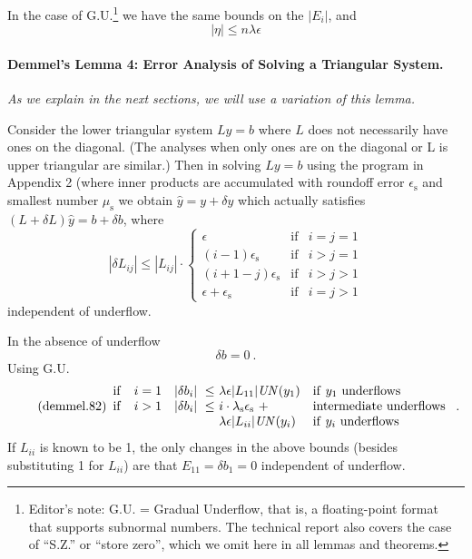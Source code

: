 \documentclass[a4paper]{article}
\begin{document}
In the case of G.U.\footnote{Editor's note: G.U. = Gradual Underflow, that is,
a floating-point format that supports subnormal numbers.  The technical report also covers the case of ``S.Z.'' or ``store zero'', which we omit here in all lemmas and theorems.}
we have the same bounds on the $|E_i|$, and
\begin{equation}\tag{demmel.34}
|\eta| \le n \lambda \epsilon
\end{equation}


\paragraph*{Demmel's Lemma 4: Error Analysis of Solving a Triangular System.}
\emph{As we explain in the next sections, we will use a variation
of this lemma.}

Consider the lower triangular system $Ly=b$ where $L$ does not necessarily
have ones on the diagonal.  (The analyses when only ones are on the
diagonal or L is upper triangular are similar.)  Then in solving
$Ly=b$ using the program in Appendix 2 (where inner products are
accumulated with roundoff error $\epsilon_\mathrm{s}$ and
smallest number $\mu_\mathrm{s}$ we obtain $\hat{y}=y+\delta y$ which
actually satisfies $(L+\delta L)\hat{y}= b + \delta b$, where
\begin{equation}\tag{demmel.80}
  |\delta L_{ij}| \le |L_{ij}| \cdot \left\lbrace
  \begin{array}{lll}
    \epsilon & \mathrm{if} & i=j=1 \\
    (i-1)\epsilon_\mathrm{s} & \mathrm{if} & i>j=1 \\
    (i+1-j)\epsilon_\mathrm{s} & \mathrm{if} & i>j>1 \\
    \epsilon+\epsilon_\mathrm{s} & \mathrm{if} & i=j>1 
  \end{array}\right.
\end{equation}
independent of underflow.

In the absence of underflow
\begin{equation}\tag{demmel.81}
  \delta b = 0~.
\end{equation}
Using G.U.
\begin{equation}\tag{demmel.82}
  \begin{array}{lcl@{~}ll}
    \mathrm{if} & i=1 & |\delta b_i |~ \le &\lambda\epsilon|L_{11}|\mathit{UN}(y_1)
    & \mathrm{if}~y_1~\mathrm{underflows} \\
    \mathrm{if} & i>1 & |\delta b_i |~ \le &i \cdot \lambda_\mathrm{s}\epsilon_\mathrm{s}~ + & \mathrm{intermediate~underflows} \\
    & & & \lambda \epsilon |L_{ii}| \mathit{UN}(y_i) 
    & \mathrm{if}~y_i~\mathrm{underflows}
  \end{array} ~.
\end{equation}
If $L_{ii}$ is known to be 1, the only changes in the above bounds
(besides substituting 1 for $L_{ii}$) are that $E_{11} = \delta b_1 = 0$
independent of underflow.
\end{document}
